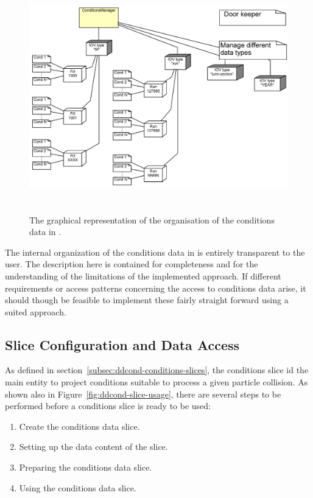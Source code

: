 \documentclass[10pt,a4paper]{article}
\begin{document}
\begin{figure}[h]
  \begin{center}\includegraphics[height=10cm] {DDCond-ConditionsStore.png}
    \caption{The graphical representation of the organisation of the
             conditions data in \DDH. }
    \label{fig:ddcond-data-organization}
  \end{center}
\end{figure}
\vspace{-0.5cm}


\noindent
The internal organization of the conditions data in \DDC is entirely 
transparent to the user. The description here is contained for
completeness and for the understanding of the limitations of the implemented
approach. If different requirements or access patterns concerning the 
access to conditions data arise, it should though be feasible to implement
these fairly straight forward using a suited approach.

\subsection{Slice Configuration and Data Access}
\label{subsec:ddcond-data-access}

\noindent
As defined in section~\ref{subsec:ddcond-conditions-slices}, the conditions slice
id the main entity to project conditions suitable to process a given particle
collision. As shown also in Figure~\ref{fig:ddcond-slice-usage}, there are 
several steps to be performed before a conditions slice is ready to be used:
\begin{enumerate}
\item Create the conditions data slice.
\item Setting up the data content of the slice.
\item Preparing the conditions data slice.
\item Using the conditions data slice.
\end{enumerate}
\end{document}
